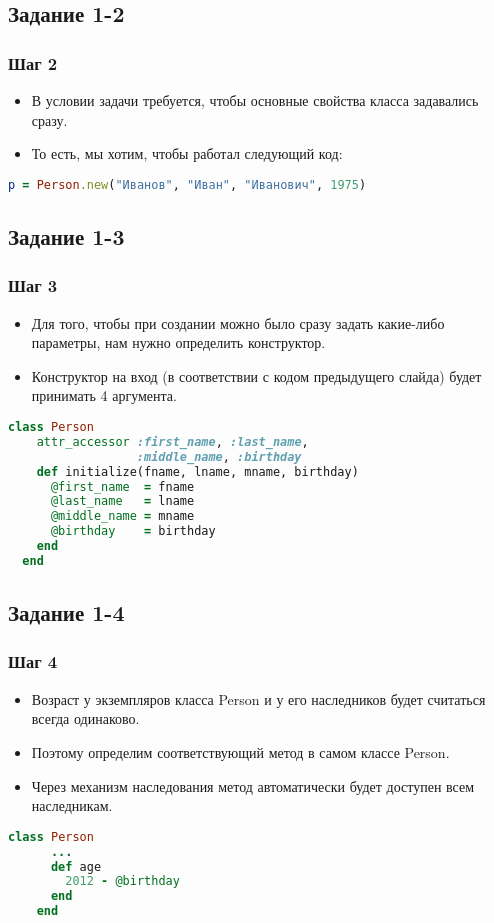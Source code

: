 \documentclass[compress,red]{beamer}
\begin{document}
\subsection{Задание 1-2}
\begin{frame}[fragile]
  \frametitle{Шаг 2}
  \begin{itemize}
    \item В условии задачи требуется, чтобы основные свойства класса задавались сразу.
    \item То есть, мы хотим, чтобы работал следующий код:
  \end{itemize}
  \scriptsize{
  \begin{lstlisting}[language=ruby,basicstyle=\footnotesize,label=ruby2,caption=Пример объекта]
    p = Person.new("Иванов", "Иван", "Иванович", 1975)
  \end{lstlisting}
  }
\end{frame}

\subsection{Задание 1-3}
\begin{frame}[fragile]
  \frametitle{Шаг 3}
  \begin{itemize}
    \item Для того, чтобы при создании можно было сразу задать какие-либо параметры, нам нужно определить конструктор.
    \item Конструктор на вход (в соответствии с кодом предыдущего слайда) будет принимать 4 аргумента.
  \end{itemize}
  \scriptsize{
  \begin{lstlisting}[language=ruby,basicstyle=\footnotesize,label=ruby3,caption=Конструктор]
  class Person
    attr_accessor :first_name, :last_name,
                  :middle_name, :birthday
    def initialize(fname, lname, mname, birthday)
      @first_name  = fname
      @last_name   = lname
      @middle_name = mname
      @birthday    = birthday 
    end
  end    
  \end{lstlisting}
  }
\end{frame}

\subsection{Задание 1-4}
\begin{frame}[fragile]
  \frametitle{Шаг 4}
  \begin{itemize}
    \item Возраст у экземпляров класса Person и у его наследников будет считаться всегда одинаково.
    \item Поэтому определим соответствующий метод в самом классе Person.
    \item Через механизм наследования метод автоматически будет доступен всем наследникам.
  \end{itemize}
  \scriptsize{
  \begin{lstlisting}[language=ruby,basicstyle=\footnotesize,label=ruby4,caption=Метод age]
    class Person
      ...
      def age
        2012 - @birthday
      end
    end
  \end{lstlisting}
  }
\end{frame}
\end{document}
